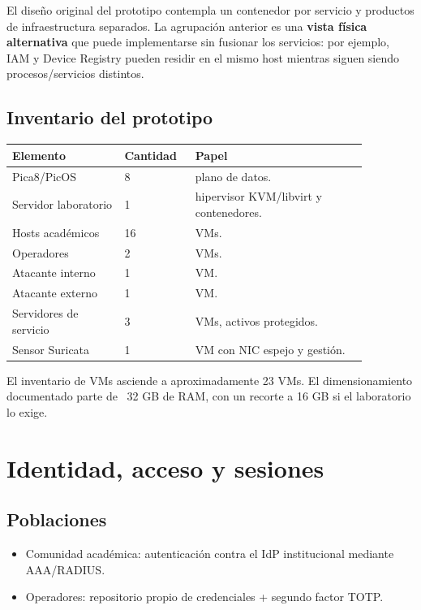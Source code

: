 \documentclass[11pt,a4paper]{article}
\begin{document}
El diseño original del prototipo contempla un contenedor por servicio y productos de infraestructura separados. La agrupación anterior es una \textbf{vista física alternativa} que puede implementarse sin fusionar los servicios: por ejemplo, IAM y Device Registry pueden residir en el mismo host mientras siguen siendo procesos/servicios distintos.

\subsection{Inventario del prototipo}

\begin{longtable}{p{0.28\linewidth}p{0.16\linewidth}p{0.43\linewidth}}
\toprule
Elemento & Cantidad & Papel\\
\midrule
Pica8/PicOS & 8 & plano de datos.\\
Servidor laboratorio & 1 & hipervisor KVM/libvirt y contenedores.\\
Hosts académicos & 16 & VMs.\\
Operadores & 2 & VMs.\\
Atacante interno & 1 & VM.\\
Atacante externo & 1 & VM.\\
Servidores de servicio & 3 & VMs, activos protegidos.\\
Sensor Suricata & 1 & VM con NIC espejo y gestión.\\
\bottomrule
\end{longtable}

El inventario de VMs asciende a aproximadamente 23 VMs. El dimensionamiento documentado parte de ~32 GB de RAM, con un recorte a 16 GB si el laboratorio lo exige.

\section{Identidad, acceso y sesiones}

\subsection{Poblaciones}

\begin{itemize}
\item Comunidad académica: autenticación contra el IdP institucional mediante AAA/RADIUS.
\item Operadores: repositorio propio de credenciales + segundo factor TOTP.
\end{itemize}
\end{document}
